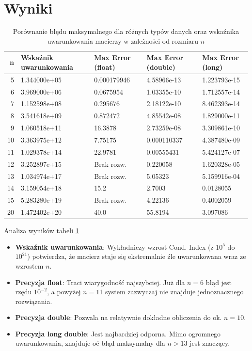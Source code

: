 \documentclass[twoside]{article}
\begin{document}
\section{Wyniki}
\begin{table}[h!]
\centering
\begin{tabular}{|r|l|l|l|l|}
\hline
\textbf{n} & \textbf{Wskaźnik uwarunkowania} & \textbf{Max Error (float)} & \textbf{Max Error (double)} & \textbf{Max Error (long)} \\ \hline
5   & 1.344000e+05 & 0.000179946 & 4.58966e-13 & 1.223793e-15 \\ \hline
6   & 3.969000e+06 & 0.0675954   & 1.03355e-10 & 1.712557e-14 \\ \hline
7   & 1.152598e+08 & 0.295676    & 2.18122e-10 & 8.462393e-14 \\ \hline
8   & 3.541618e+09 & 0.872472    & 4.85542e-08 & 1.829000e-11 \\ \hline
9   & 1.060518e+11 & 16.3878     & 2.73259e-08 & 3.309861e-10 \\ \hline
10  & 3.363975e+12 & 7.75175     & 0.000110337 & 4.387480e-09 \\ \hline
11  & 1.029378e+14 & 22.9781     & 0.00555431  & 5.424127e-07 \\ \hline
12  & 3.252897e+15 & Brak rozw.  & 0.220058    & 1.620328e-05 \\ \hline
13  & 1.034974e+17 & Brak rozw.  & 5.05323     & 5.159916e-04 \\ \hline
14  & 3.159054e+18 & 15.2        & 2.7003      & 0.0128055 \\ \hline
15  & 5.283280e+19 & Brak rozw.  & 4.22136     & 0.4002059 \\ \hline
20  & 1.472402e+20 & 40.0        & 55.8194     & 3.097086 \\ \hline
\end{tabular}

\caption{Porównanie błędu maksymalnego dla różnych typów danych oraz wskaźnika uwarunkowania macierzy w zależności od rozmiaru $n$}
\label{tab:bledy_n}
\end{table}


Analiza wyników tabeli \ref{tab:bledy_n}
\begin{itemize}
    \item \textbf{Wskaźnik uwarunkowania}: Wykładniczy wzrost Cond. Index (z $10^5$ do $10^{21}$) potwierdza, że macierz staje się ekstremalnie źle 
    uwarunkowana wraz ze wzrostem $n$.
    \item \textbf{Precyzja float}: Traci wiarygodność najszybciej. Już dla $n=6$ błąd jest rzędu $10^{-2}$, a powyżej $n=11$ system zazwyczaj
    nie znajduje jednoznacznego rozwiązania.
    \item \textbf{Precyzja double}: Pozwala na relatywnie dokładne obliczenia do ok. $n=10$.
    \item \textbf{Precyzja long double}: Jest najbardziej odporna. Mimo ogromnego uwarunkowania, znajduje oć błąd maksymalny dla $n > 13$ jest znaczący.  

\end{itemize}
      
\end{document}

